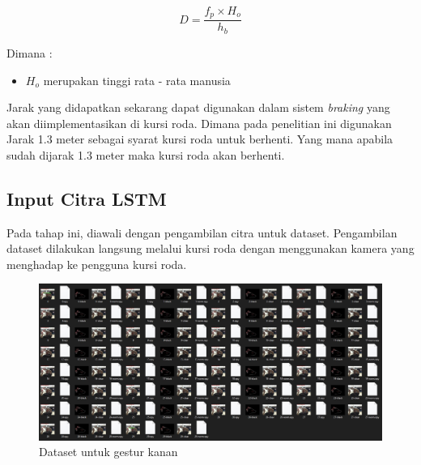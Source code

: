 \begin{equation}
  \label{eq:focallength}
    D = \frac{f_p \times H_o}{h_b}
\end{equation}

Dimana :
\begin{itemize}
    \item $H_o$ merupakan tinggi rata - rata manusia
\end{itemize}

Jarak yang didapatkan sekarang dapat digunakan dalam sistem\emph{ braking} yang akan diimplementasikan di kursi roda. Dimana pada penelitian ini digunakan Jarak 1.3 meter sebagai syarat kursi roda untuk berhenti. Yang mana apabila sudah dijarak 1.3 meter maka kursi roda akan berhenti.

\subsection{Input Citra LSTM}
Pada tahap ini, diawali dengan pengambilan citra untuk dataset. Pengambilan dataset dilakukan langsung melalui kursi roda dengan menggunakan kamera yang menghadap ke pengguna kursi roda. 
\begin{figure} [H] \centering
  \includegraphics[scale=0.28]{gambar/dataset.jpg}
  \caption{Dataset untuk gestur kanan}
  \label{fig:gestur dataset}
\end{figure}

